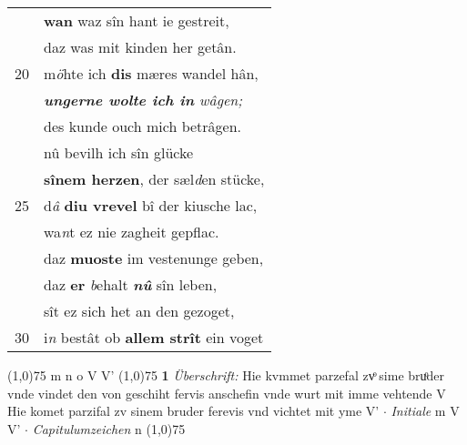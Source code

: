 \documentclass[8pt,a4paper,notitlepage]{article}
\begin{document}
\begin{table}[ht]
\begin{minipage}[t]{0.5\linewidth}
\begin{tabular}{rl}
 & \textbf{wan} waz sîn hant ie gestreit,\\ 
 & daz was mit kinden her getân.\\ 
20 & m\textit{ö}hte ich \textbf{dis} mæres wandel hân,\\ 
 & \textit{\textbf{ungerne wolte ich in} wâgen;}\\ 
 & des kunde ouch mich betrâgen.\\ 
 & nû bevilh ich sîn glücke\\ 
 & \textbf{sînem herzen}, der sæl\textit{d}en stücke,\\ 
25 & d\textit{â} \textbf{diu vrevel} bî der kiusche lac,\\ 
 & wa\textit{n}t ez nie zagheit gepflac.\\ 
 & daz \textbf{muoste} im vestenunge geben,\\ 
 & daz \textbf{er} \textit{b}ehalt \textit{\textbf{nû}} sîn leben,\\ 
 & sît ez sich het an den gezoget,\\ 
30 & i\textit{n} bestât ob \textbf{allem strît} ein voget\\ 
\end{tabular}
\scriptsize
\line(1,0){75} \newline
m n o V V' \newline
\line(1,0){75} \newline
\textbf{1} \textit{Überschrift:} Hie kvmmet parzefal zvͦ sime bruͦder vnde vindet den von geschiht fervis anschefin vnde wurt mit imme vehtende V  Hie komet parzifal zv sinem bruder ferevis vnd vichtet mit yme V'   $\cdot$ \textit{Initiale} m V V'   $\cdot$ \textit{Capitulumzeichen} n  \newline
\line(1,0){75} \newline

\end{minipage}
\end{table}
\end{document}
